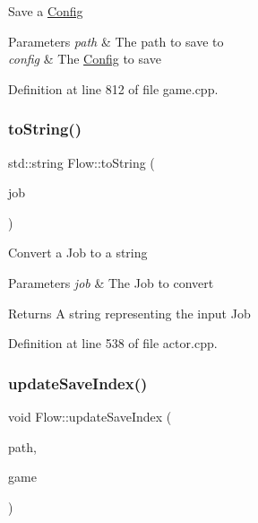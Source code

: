 Save a \hyperlink{struct_flow_1_1_config}{Config} 
\begin{DoxyParams}{Parameters}
{\em path} & The path to save to \\
\hline
{\em config} & The \hyperlink{struct_flow_1_1_config}{Config} to save \\
\hline
\end{DoxyParams}


Definition at line 812 of file game.\+cpp.

\hypertarget{namespace_flow_a6f3143a530f180f3bff735701d83f295}{}\label{namespace_flow_a6f3143a530f180f3bff735701d83f295} 
\subsubsection{\texorpdfstring{to\+String()}{toString()}}
{\footnotesize\ttfamily std\+::string Flow\+::to\+String (\begin{DoxyParamCaption}\item[{\hyperlink{namespace_flow_a05bb774db920847e46f3779aaef1b07b}{Flow\+::\+Job}}]{job }\end{DoxyParamCaption})}

Convert a Job to a string 
\begin{DoxyParams}{Parameters}
{\em job} & The Job to convert \\
\hline
\end{DoxyParams}
\begin{DoxyReturn}{Returns}
A string representing the input Job 
\end{DoxyReturn}


Definition at line 538 of file actor.\+cpp.

\hypertarget{namespace_flow_a0cd8a32e71f1630075020041656000ac}{}\label{namespace_flow_a0cd8a32e71f1630075020041656000ac} 
\subsubsection{\texorpdfstring{update\+Save\+Index()}{updateSaveIndex()}}
{\footnotesize\ttfamily void Flow\+::update\+Save\+Index (\begin{DoxyParamCaption}\item[{const std\+::string \&}]{path,  }\item[{const \hyperlink{class_flow_1_1_game}{Game} \&}]{game }\end{DoxyParamCaption})}

